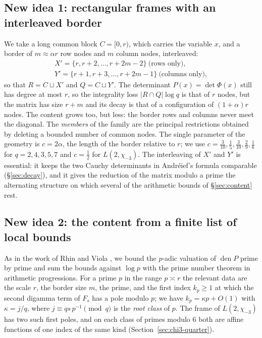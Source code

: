\documentclass[11pt]{amsart}
\theoremstyle{definition}
\theoremstyle{remark}
\numberwithin{equation}{section}
\newcommand{\den}{\operatorname{den}}
\begin{document}
\subsection{New idea 1: rectangular frames with an interleaved border}
We take a long common block $C=[0,r)$, which carries the variable $x$, and a border of $m\approx\alpha r$ row nodes and
$m$ column nodes, interleaved:
\[
\begin{gathered}
 X'=\{r,r+2,\dots,r+2m-2\}\ \text{(rows only)},\\ Y'=\{r+1,r+3,\dots,r+2m-1\}\ \text{(columns only)},
\end{gathered}
\]
so that $R=C\sqcup X'$ and $Q=C\sqcup Y'$. The determinant $P(x)=\det\Phi(x)$ still has degree at most $r$, so the
integrality loss $|R\cap Q|\log q$ is that of $r$ nodes, but the matrix has size $r+m$ and its decay is that of a
configuration of $(1+\alpha)r$ nodes. The content grows too, but less: the border rows and columns never meet the
diagonal. The \emph{members} of the family are the principal restrictions obtained by deleting a bounded number of
common nodes. The single parameter of the geometry is $c=2\alpha$, the length of the border relative to $r$; we use
$c=\frac3{10},\frac15,\frac3{10},\frac29,\frac16$ for $q=2,4,3,5,7$ and $c=\frac12$ for $L(2,\chi_{-3})$. The interleaving of $X'$
and $Y'$ is essential: it keeps the two Cauchy determinants in Andr\'eief's formula comparable (\S\ref{sec:decay}),
and it gives the reduction of the matrix modulo a prime the alternating structure on which several of the arithmetic
bounds of \S\ref{sec:content} rest.

\subsection{New idea 2: the content from a finite list of local bounds}
As in the work of Rhin and Viola \cite{RhinViola96,RhinViola01}, we bound the $p$-adic valuation of
$\den P$ prime by prime and sum the bounds against $\log p$ with the prime number theorem in arithmetic progressions.
For a prime $p$ in the range $p\asymp r$ the relevant data are the scale $r$, the border size $m$, the prime, and the
first index $k_p\ge1$ at which the second digamma term of $F_s$ has a pole modulo $p$; we have $k_p=\kappa p+O(1)$
with $\kappa=j/q$, where $j\equiv qs\,p^{-1}\pmod q$ is the \emph{root class} of $p$. The frame of $L(2,\chi_{-3})$ has two
such first poles, and on each class of primes modulo $6$ both are affine functions of one index of the same kind
(Section~\ref{sec:chi3-quarter}).
\end{document}
